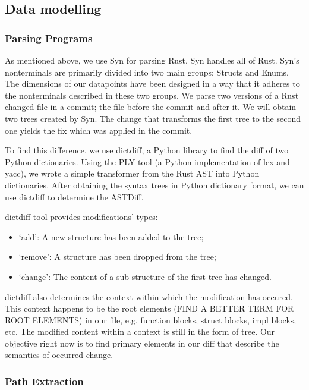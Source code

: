 \subsection{Data modelling}

\subsubsection{Parsing Programs}

As mentioned above, we use Syn for parsing Rust. Syn handles all of Rust. Syn's nonterminals are primarily divided into two main groups; Structs and Enums. The dimensions of our datapoints have been designed in a way that it adheres to the nonterminals described in these two groups. We parse two versions of a Rust changed file in a commit; the file before the commit and after it. We will obtain two trees created by Syn. The change that transforms the first tree to the second one yields the fix which was applied in the commit. 

To find this difference, we use dictdiff, a Python library to find the diff of two Python dictionaries. Using the PLY tool (a Python implementation of lex and yacc), we wrote a simple transformer from the Rust AST into Python dictionaries. After obtaining the syntax trees in Python dictionary format, we can use dictdiff to determine the ASTDiff. 

dictdiff tool provides modifications' types: 
\begin{itemize}
\item `add': A new structure has been added to the tree; 
\item `remove': A structure has been dropped from the tree; 
\item `change': The content of a sub structure of the first tree has changed.
\end{itemize}
dictdiff also determines the context within which the modification has occured. This context happens to be the root elements (FIND A BETTER TERM FOR ROOT ELEMENTS) in our file, e.g. function blocks, struct blocks, impl blocks, etc. The modified content within a context is still in the form of tree. Our objective right now is to find primary elements in our diff that describe the semantics of occurred change.

\subsubsection{Path Extraction}

